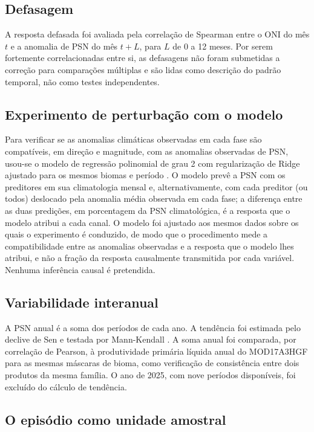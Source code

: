 \documentclass[a4paper,fleqn]{cas-sc}
\begin{document}
\subsection{Defasagem}

A resposta defasada foi avaliada pela correlação de Spearman entre o ONI do mês $t$ e a anomalia de PSN do mês $t+L$, para $L$ de 0 a 12 meses. Por serem fortemente correlacionadas entre si, as defasagens não foram submetidas a correção para comparações múltiplas e são lidas como descrição do padrão temporal, não como testes independentes.

\subsection{Experimento de perturbação com o modelo}

Para verificar se as anomalias climáticas observadas em cada fase são compatíveis, em direção e magnitude, com as anomalias observadas de PSN, usou-se o modelo de regressão polinomial de grau 2 com regularização de Ridge ajustado para os mesmos biomas e período \citep{oliveira2026, hoerl1970}. O modelo prevê a PSN com os preditores em sua climatologia mensal e, alternativamente, com cada preditor (ou todos) deslocado pela anomalia média observada em cada fase; a diferença entre as duas predições, em porcentagem da PSN climatológica, é a resposta que o modelo atribui a cada canal. O modelo foi ajustado aos mesmos dados sobre os quais o experimento é conduzido, de modo que o procedimento mede a compatibilidade entre as anomalias observadas e a resposta que o modelo lhes atribui, e não a fração da resposta causalmente transmitida por cada variável. Nenhuma inferência causal é pretendida.

\subsection{Variabilidade interanual}

A PSN anual é a soma dos períodos de cada ano. A tendência foi estimada pelo declive de Sen \citep{sen1968} e testada por Mann-Kendall \citep{mann1945}. A soma anual foi comparada, por correlação de Pearson, à produtividade primária líquida anual do MOD17A3HGF para as mesmas máscaras de bioma, como verificação de consistência entre dois produtos da mesma família. O ano de 2025, com nove períodos disponíveis, foi excluído do cálculo de tendência.

\subsection{O episódio como unidade amostral}
\end{document}
